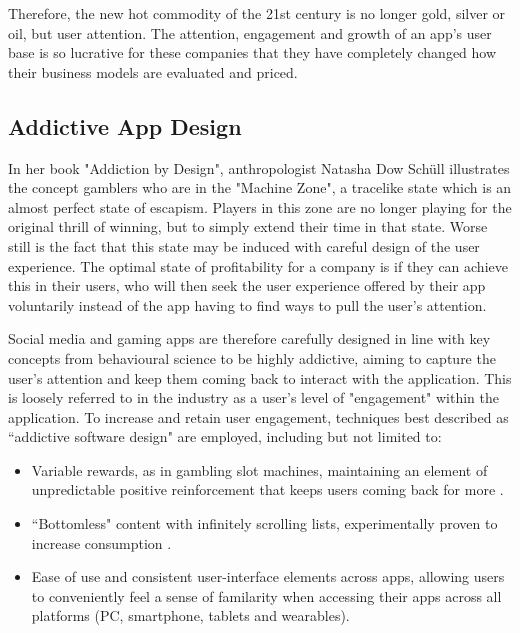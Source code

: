 Therefore, the new hot commodity of the 21st century is no longer gold, silver or oil, but user attention. The attention, engagement and growth of an app's user base is so lucrative for these companies that they have completely changed how their business models are evaluated and priced.

\subsection{Addictive App Design}
In her book "Addiction by Design", anthropologist Natasha Dow Schüll \cite{schull2014addiction} illustrates the concept gamblers who are in the "Machine Zone", a tracelike state which is an almost perfect state of escapism. Players in this zone are no longer playing for the original thrill of winning, but to simply extend their time in that state. Worse still is the fact that this state may be induced with careful design of the user experience. The optimal state of profitability for a company is if they can achieve this in their users, who will then seek the user experience offered by their app voluntarily instead of the app having to find ways to pull the user's attention.

Social media and gaming apps are therefore carefully designed in line with key concepts from behavioural science to be highly addictive, aiming to capture the user's attention and keep them coming back to interact with the application. This is loosely referred to in the industry as a user's level of "engagement" within the application. To increase and retain user engagement, techniques best described as ``addictive software design" \cite{neyman2017survey} are employed, including but not limited to:

\begin{itemize}
    \item Variable rewards, as in gambling slot machines, maintaining an element of unpredictable positive reinforcement that keeps users coming back for more \cite{neyman2017survey}.
    \item ``Bottomless" content with infinitely scrolling lists, experimentally proven to increase consumption \cite{neyman2017survey}.
    \item Ease of use and consistent user-interface elements across apps, allowing users to conveniently feel a sense of familarity when accessing their apps across all platforms (PC, smartphone, tablets and wearables).
\end{itemize}

